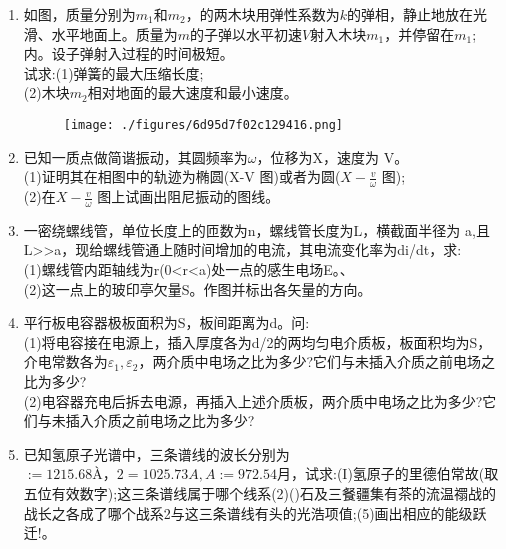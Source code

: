 
\begin{enumerate}
\item 如图，质量分别为$m_1$和$m_2$，的两木块用弹性系数为$k$的弹相，静止地放在光滑、水平地面上。质量为$m$的子弹以水平初速$V$射入木块$m_1$，并停留在$m_1$;内。设子弹射入过程的时间极短。\\
试求:(1)弹簧的最大压缩长度;\\
(2)木块$m_2$相对地面的最大速度和最小速度。
\begin{figure}[ht]
\centering
\texttt{[image: ./figures/6d95d7f02c129416.png]}
\caption{} \label{fig_SSD02_1}
\end{figure}
\item  已知一质点做简谐振动，其圆频率为$\omega$，位移为X，速度为 V。\\
(1)证明其在相图中的轨迹为椭圆(X-V 图)或者为圆($\displaystyle X-\frac{v}{\omega}$ 图);\\
(2)在$\displaystyle X-\frac{v}{\omega}$ 图上试画出阻尼振动的图线。
\item 一密绕螺线管，单位长度上的匝数为n，螺线管长度为L，横截面半径为 a,且L>>a，现给螺线管通上随时间增加的电流，其电流变化率为di/dt，求:\\
(1)螺线管内距轴线为r(0<r<a)处一点的感生电场E。、\\
(2)这一点上的玻印亭欠量S。作图并标出各矢量的方向。
\item 平行板电容器极板面积为S，板间距离为d。问:\\
(1)将电容接在电源上，插入厚度各为d/2的两均匀电介质板，板面积均为S，介电常数各为$\varepsilon_1,\varepsilon_2$，两介质中电场之比为多少?它们与未插入介质之前电场之比为多少?\\
(2)电容器充电后拆去电源，再插入上述介质板，两介质中电场之比为多少?它们与未插入介质之前电场之比为多少?
\item 已知氢原子光谱中，三条谱线的波长分别为$:=1215.68À，2=1025.73A,A:=972.54月$，试求:(I)氢原子的里德伯常故(取五位有效数字);这三条谱线属于哪个线系(2)()石及三餐疆集有茶的流温禤战的战长之各成了哪个战系2与这三条谱线有头的光浩项值;(5)画出相应的能级跃迁!。
\end{enumerate}
